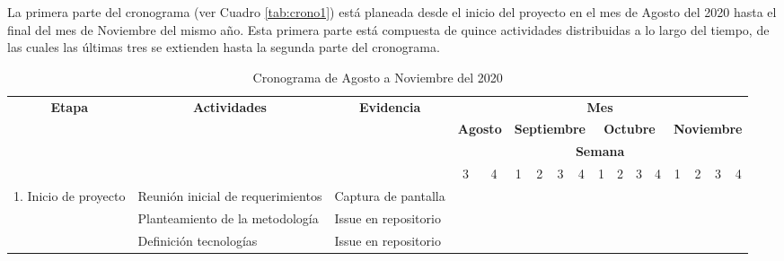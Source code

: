 La primera parte del cronograma (ver Cuadro \ref{tab:crono1}) está planeada desde el inicio del proyecto en el mes de Agosto del 2020 hasta el final del mes de Noviembre del mismo año. Esta primera parte está compuesta de quince actividades distribuidas a lo largo del tiempo, de las cuales las últimas tres se extienden hasta la segunda parte del cronograma.

\begin{table}[H]
    \centering
    \caption{Cronograma de Agosto a Noviembre del 2020}
    \begin{adjustbox}{width={\textwidth},totalheight={\textheight},keepaspectratio}%
    \begin{tabular}{cp{9.945em}p{9.945em}rrrrrrrrrrrrrr}
    \hline
    \multirow{4}[8]{*}{\textbf{Etapa}} & \multicolumn{1}{c}{\multirow{4}[8]{*}{\textbf{Actividades}}} & \multicolumn{1}{c}{\multirow{4}[8]{*}{\textbf{Evidencia}}} & \multicolumn{14}{c}{\textbf{Mes}} \bigstrut\\
    \cline{4-17}  & \multicolumn{1}{c}{} & \multicolumn{1}{c}{} & \multicolumn{2}{c}{\textbf{Agosto}} & \multicolumn{4}{c}{\textbf{Septiembre}} & \multicolumn{4}{c}{\textbf{Octubre}} & \multicolumn{4}{c}{\textbf{Noviembre}} \bigstrut\\
    \cline{4-17}  & \multicolumn{1}{c}{} & \multicolumn{1}{c}{} & \multicolumn{14}{c}{\textbf{Semana}} \bigstrut\\
    \cline{4-17}  & \multicolumn{1}{c}{} & \multicolumn{1}{c}{} & \multicolumn{1}{c}{3} & \multicolumn{1}{c}{4} & \multicolumn{1}{c}{1} & \multicolumn{1}{c}{2} & \multicolumn{1}{c}{3} & \multicolumn{1}{c}{4} & \multicolumn{1}{c}{1} & \multicolumn{1}{c}{2} & \multicolumn{1}{c}{3} & \multicolumn{1}{c}{4} & \multicolumn{1}{c}{1} & \multicolumn{1}{c}{2} & \multicolumn{1}{c}{3} & \multicolumn{1}{c}{4} \bigstrut\\
    \cline{1-3}\multicolumn{1}{c}{\multirow{5}[10]{*}{1. Inicio de proyecto}} & Reunión inicial de requerimientos & Captura de pantalla & \cellcolor[rgb]{ .557,  .663,  .859} &   &   &   &   &   &   &   &   &   &   &   &   &  \bigstrut\\
    \cline{2-3}  & Planteamiento de la metodología & Issue en repositorio & \cellcolor[rgb]{ .851,  .882,  .949} & \cellcolor[rgb]{ .851,  .882,  .949} & \cellcolor[rgb]{ .851,  .882,  .949} &   &   &   &   &   &   &   &   &   &   &  \bigstrut\\
    \cline{2-3}  & Definición tecnologías & Issue en repositorio & \cellcolor[rgb]{ .557,  .663,  .859} & \cellcolor[rgb]{ .557,  .663,  .859} & \cellcolor[rgb]{ .557,  .663,  .859} &   &   &   &   &   &   &   &   &   &   &  \bigstrut\\

\end{tabular}
\end{adjustbox}
\end{table}
